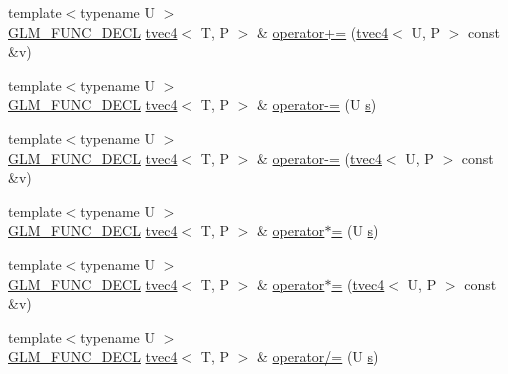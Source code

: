 \begin{DoxyCompactItemize}
\item 
{\footnotesize template$<$typename U $>$ }\\\hyperlink{setup_8hpp_ab2d052de21a70539923e9bcbf6e83a51}{G\+L\+M\+\_\+\+F\+U\+N\+C\+\_\+\+D\+E\+CL} \hyperlink{structglm_1_1detail_1_1tvec4}{tvec4}$<$ T, P $>$ \& \hyperlink{structglm_1_1detail_1_1tvec4_a97b781953b588e8a5063f52ada786bdb}{operator+=} (\hyperlink{structglm_1_1detail_1_1tvec4}{tvec4}$<$ U, P $>$ const \&v)
\item 
{\footnotesize template$<$typename U $>$ }\\\hyperlink{setup_8hpp_ab2d052de21a70539923e9bcbf6e83a51}{G\+L\+M\+\_\+\+F\+U\+N\+C\+\_\+\+D\+E\+CL} \hyperlink{structglm_1_1detail_1_1tvec4}{tvec4}$<$ T, P $>$ \& \hyperlink{structglm_1_1detail_1_1tvec4_abac89afd5c01b6f6b87d826255edf0dd}{operator-\/=} (U \hyperlink{structglm_1_1detail_1_1tvec4_a82cbced4cbd070056c5acbc1d4d4906f}{s})
\item 
{\footnotesize template$<$typename U $>$ }\\\hyperlink{setup_8hpp_ab2d052de21a70539923e9bcbf6e83a51}{G\+L\+M\+\_\+\+F\+U\+N\+C\+\_\+\+D\+E\+CL} \hyperlink{structglm_1_1detail_1_1tvec4}{tvec4}$<$ T, P $>$ \& \hyperlink{structglm_1_1detail_1_1tvec4_ad5f9a3e666a750055fa074ba58c67d09}{operator-\/=} (\hyperlink{structglm_1_1detail_1_1tvec4}{tvec4}$<$ U, P $>$ const \&v)
\item 
{\footnotesize template$<$typename U $>$ }\\\hyperlink{setup_8hpp_ab2d052de21a70539923e9bcbf6e83a51}{G\+L\+M\+\_\+\+F\+U\+N\+C\+\_\+\+D\+E\+CL} \hyperlink{structglm_1_1detail_1_1tvec4}{tvec4}$<$ T, P $>$ \& \hyperlink{structglm_1_1detail_1_1tvec4_a938a7911eafdf499c4c4461255343d93}{operator$\ast$=} (U \hyperlink{structglm_1_1detail_1_1tvec4_a82cbced4cbd070056c5acbc1d4d4906f}{s})
\item 
{\footnotesize template$<$typename U $>$ }\\\hyperlink{setup_8hpp_ab2d052de21a70539923e9bcbf6e83a51}{G\+L\+M\+\_\+\+F\+U\+N\+C\+\_\+\+D\+E\+CL} \hyperlink{structglm_1_1detail_1_1tvec4}{tvec4}$<$ T, P $>$ \& \hyperlink{structglm_1_1detail_1_1tvec4_a37ac1922f8feef122bfa57800b4124f4}{operator$\ast$=} (\hyperlink{structglm_1_1detail_1_1tvec4}{tvec4}$<$ U, P $>$ const \&v)
\item 
{\footnotesize template$<$typename U $>$ }\\\hyperlink{setup_8hpp_ab2d052de21a70539923e9bcbf6e83a51}{G\+L\+M\+\_\+\+F\+U\+N\+C\+\_\+\+D\+E\+CL} \hyperlink{structglm_1_1detail_1_1tvec4}{tvec4}$<$ T, P $>$ \& \hyperlink{structglm_1_1detail_1_1tvec4_a6228f03a4111e2d08f76f1707bfedc7f}{operator/=} (U \hyperlink{structglm_1_1detail_1_1tvec4_a82cbced4cbd070056c5acbc1d4d4906f}{s})

\end{DoxyCompactItemize}
